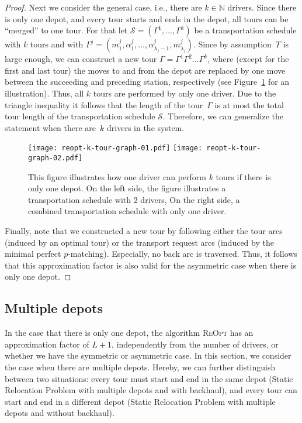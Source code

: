 \documentclass[english]{llncs}
\numberwithin{sublemma}{lemma}
\newcommand{\NN}{\ensuremath{\mathbb{N}}}
\newcommand{\capd}{\ensuremath{L}}
\newcommand{\tourd}{\ensuremath{\Gamma}}
\newcommand{\action}{\ensuremath{\alpha}}
\newcommand{\move}{\ensuremath{m}}
\newcommand{\sched}{\mathcal{S}}
\newcommand{\schedule}{\sched}
\newcommand{\REOPT}{\textsc{ReOpt}\xspace}
\begin{document}
\begin{proof}
Next we consider the general case, i.e., there are $k \in \NN$ drivers.
Since there is only one depot, and every tour starts and ends in the depot, all tours can be ``merged'' to one tour.
For that let $\schedule = (\tourd^1, \dotsc, \tourd^k)$ be a transportation schedule with $k$ tours and with $\tourd^j = (\move^j_1, \action^j_1, \dotsc, \action^j_{\lambda_j-1}, \move^j_{\lambda_j})$.
Since by assumption~$T$ is large enough, we can construct a new tour $\tourd = \tourd^1 \tourd^2 \dotsc \tourd^k$,
where (except for the first and last tour) the moves to and from the depot are replaced by one move between
the succeeding and preceding station, respectively (see Figure~\ref{fig: static: reopt: k tour one driver} for an illustration).
Thus, all $k$ tours are performed by only one driver.
Due to the triangle inequality it follows that the length of the tour~$\tourd$ is at most the total tour length of the transportation schedule $\schedule$.
Therefore, we can generalize the statement when there are~$k$ drivers in the system.

\begin{figure}[ht]
    \centering
    \texttt{[image: reopt-k-tour-graph-01.pdf]}
    \texttt{[image: reopt-k-tour-graph-02.pdf]}
 \caption{
  This figure illustrates how one driver can perform $k$ tours if there is only one depot.
  On the left side, the figure illustrates a transportation schedule with 2 drivers,
  On the right side, a combined transportation schedule with only one driver.
 }
 \label{fig: static: reopt: k tour one driver}
\end{figure}




Finally, note that we constructed a new tour by following either the tour arcs (induced by an optimal tour) or the transport request arcs (induced by the minimal perfect $p$-matching).
Especially, no back arc is traversed.
Thus, it follows that this approximation factor is also valid for the asymmetric case when there is only one depot.
\end{proof}



\subsection{Multiple depots}\label{sec: static: reopt: multiple depot}

In the case that there is only one depot, the algorithm \REOPT has an approximation factor of $\capd + 1$, independently from the number of drivers,
or whether we have the symmetric or asymmetric case.
In this section, we consider the case when there are multiple depots.
Hereby, we can further distinguish between two situations: every tour must start and end in the same depot (Static Relocation Problem with multiple depots and with backhaul),
and every tour can start and end in a different depot (Static Relocation Problem with multiple depots and without backhaul).
\end{document}
